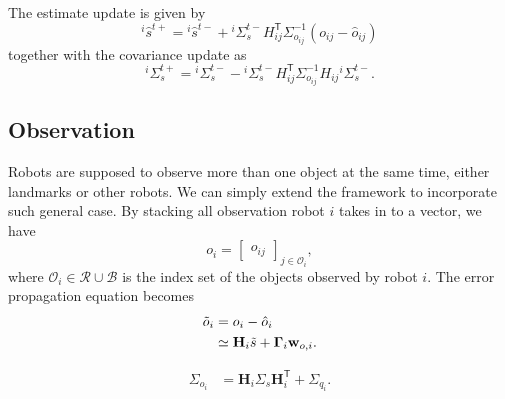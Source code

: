 \documentclass[xcolor=x11names]{article}
\DeclareMathOperator\T{\mathsf{T}}
\begin{document}
   The estimate update is given by
   \begin{equation}
      ^i\hat{s}^{t+} = {}^i\hat{s}^{t-} + {}^i\Sigma^{t-}_{s}  H_{ij}^{\T} \Sigma_{o_{ij}}^{-1} ({o}_{ij}  - \hat{o}_{ij})
   \end{equation}  
together with the covariance update as 
   \begin{equation}
      {}^i\Sigma^{t+}_{s} = {}^i\Sigma^{t-}_{s} - {}^i\Sigma^{t-}_{s}  H_{ij}^{\T}  \Sigma_{o_{ij}}^{-1} H_{ij} {}^i\Sigma^{t-}_{s}.
      \label{eq:robot_observation_cov_update}
   \end{equation}    


\subsection{Observation}

   Robots are supposed to observe more than one object at the same time, either landmarks or other robots. We can simply extend the framework to incorporate such general case. By stacking all observation robot $i$ takes in to a vector, we have
   \begin{equation}
      o_i = \begin{bmatrix}o_{ij}\end{bmatrix}_{j\in \mathcal{O}_i},
   \end{equation}
   where $\mathcal{O}_i \in \mathcal{R} \cup \mathcal{B}$ is the index set of the objects observed by robot $i$.
The error propagation equation becomes
   \begin{align}
      \tilde{o}_{i} &= {o}_{i}  - \hat{o}_{i} \notag \\
         &\simeq \mathbf{H}_{i} \tilde{s} + \mathbf{\Gamma}_i \mathbf{w}_{o,i}. 
   \end{align}

   \begin{align*}
      \Sigma_{o_i} &= \mathbf{H}_{i} \Sigma_s \mathbf{H}_{i}^{\T} + \Sigma_{q_i}.
   \end{align*}
   
\end{document}
